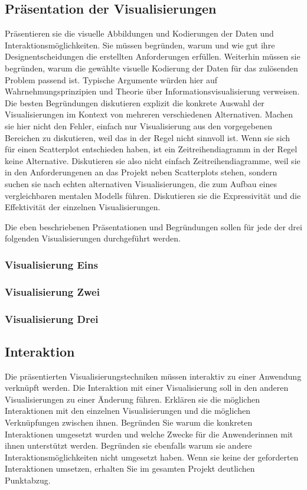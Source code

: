 \documentclass[usegeometry=true]{scrartcl}
\begin{document}
\subsection{Präsentation der Visualisierungen}
Präsentieren sie die visuelle Abbildungen und Kodierungen der Daten und Interaktionsmöglichkeiten. 
Sie müssen  begründen, warum und wie gut ihre Designentscheidungen die erstellten Anforderungen erfüllen. 
Weiterhin müssen sie begründen, warum die gewählte visuelle Kodierung der Daten für das zulösenden Problem passend ist.
Typische Argumente würden hier auf Wahrnehmungsprinzipien und Theorie über Informationsvisualisierung verweisen. 
Die besten Begründungen diskutieren explizit die konkrete Auswahl der Visualisierungen im Kontext von mehreren verschiedenen Alternativen. 
Machen sie hier nicht den Fehler, einfach nur Visualisierung aus den vorgegebenen Bereichen zu diskutieren, weil das in der Regel nicht sinnvoll ist.
Wenn sie sich für einen Scatterplot entschieden haben, ist ein Zeitreihendiagramm in der Regel keine Alternative.
Diskutieren sie also nicht einfach Zeitreihendiagramme, weil sie in den Anforderungenen an das Projekt neben Scatterplots stehen, sondern suchen sie nach echten alternativen Visualisierungen, die zum Aufbau eines vergleichbaren mentalen Modells führen. 
Diskutieren sie die Expressivität und die Effektivität der einzelnen Visualisierungen. 

Die eben beschriebenen Präsentationen und Begründungen sollen für jede der drei folgenden Visualisierungen durchgeführt werden. 
\subsubsection{Visualisierung Eins}
\subsubsection{Visualisierung Zwei}
\subsubsection{Visualisierung Drei}

\subsection{Interaktion}
Die präsentierten Visualisierungstechniken müssen interaktiv zu einer Anwendung verknüpft werden.
Die Interaktion mit einer Visualisierung soll in den anderen Visualisierungen zu einer Änderung führen. 
Erklären sie die möglichen Interaktionen mit den einzelnen Visualisierungen und die möglichen Verknüpfungen zwischen ihnen. Begründen Sie warum die konkreten Interaktionen umgesetzt wurden und welche Zwecke für die Anwenderinnen mit ihnen unterstützt werden. Begründen sie ebenfalls warum sie andere Interaktionsmöglichkeiten nicht umgesetzt haben. Wenn sie keine der geforderten Interaktionen umsetzen, erhalten Sie im gesamten Projekt deutlichen Punktabzug. 
\end{document}
